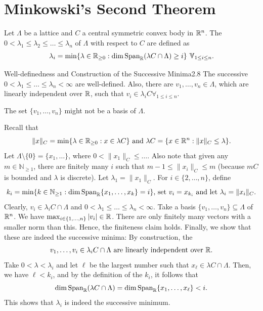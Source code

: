 \documentclass{Vorlesungstemplate_English} %
\renewcommand{\N}{\mathbb{N}_{\geq 1}}
\begin{document}
  \section{Minkowski's Second Theorem}
  Let $\Lambda$ be a lattice and $C$ a central symmetric convex body in $\mathbb{R}^n$. The  $0 < \lambda_1 \leq \lambda_2 \leq \dots \leq \lambda_n$ of $\Lambda$ with respect to $C$ are defined as
  \[ \lambda_i = \min\{ \lambda \in \R_{\geq 0}: \dim\Span_\R(\lambda C \cap \Lambda) \geq i\} \forall_{1 \leq i \leq n}.\]
  \begin{lemma}{Well-definedness and Construction of the Successive Minima}{2.8}
    The successive $0 < \lambda_1 \leq \dots \leq \lambda_n < \infty$ are well-defined. Also, there are $v_1, \dots, v_n \in \Lambda$, which are linearly independent over $\mathbb{R}$, such that $v_i \in \lambda_iC \forall_{1 \leq i \leq n}$.
  \end{lemma}
  \noindent {} The set $\{ v_1, \dots, v_n\}$ might not be a basis of $\Lambda$.
  \begin{pf}
    Recall that
    \[ \|x\|_C = \min\{ \lambda \in \mathbb{R}_{\geq 0}: x \in \lambda C\} \text{ and } \lambda C = \{ x \in \mathbb{R}^n: \|x\|_C \leq \lambda\}.\]
    Let $\Lambda \setminus \{ 0\} = \{ x_1, \dots\}$, where $0 < \| x_1 \|_C \leq \dots$. Also note that given any $m \in \N$, there are finitely many $i$ such that $m-1 \leq \|x_i\|_C \leq m$ (because $mC$ is bounded and $\lambda$ is discrete). Let $\lambda_1 = \|x_1\|_C$. For $i\in \{ 2, \dots, n\}$, define
    \[ k_i = \min\{ k \in \N: \dim\Span_\R\{ x_1, \dots, x_k\} = i\} \text{, set } v_i=x_{k_i} \text{ and let } \lambda_i = \|x_i\|_C.\]
    Clearly, $v_i \in \lambda_iC \cap \Lambda$ and $0 < \lambda_1 \leq \dots \leq \lambda_n < \infty$. {\color{blue} Take a basis $\{ v_1, \dots, v_n\} \subseteq \Lambda$ of $\mathbb{R}^n$. We have $\max_{i \in \{ 1, \dots, n\}}|v_i| \in \mathbb{R}$. There are only finitely many vectors with a smaller norm than this. Hence, the finiteness claim holds.} Finally, we show that these are indeed the successive minima: By construction, the
    \[ v_1, \dots, v_i \in \lambda_iC \cap \Lambda \text{ are linearly independent over } \mathbb{R}.\]
    Take $0 < \lambda < \lambda_i$ and let $\ell$ be the largest number such that $x_{\ell} \in \lambda C \cap \Lambda$. Then, we have $\ell < k_i$, and by the definition of the $k_i$, it follows that
    \[ \dim\text{Span}_{\mathbb{R}}(\lambda C \cap \Lambda) = \dim\text{Span}_{\mathbb{R}}\{ x_1, \dots, x_{\ell}\} < i.\]
    This shows that $\lambda_i$ is indeed the successive minimum.
    \end{pf}
\end{document}
